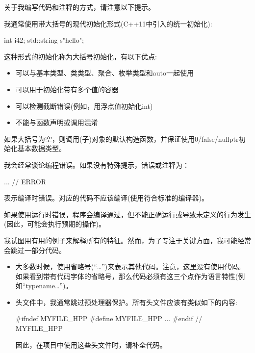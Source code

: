 
关于我编写代码和注释的方式，请注意以下提示。\par


我通常使用带大括号的现代初始化形式(C++11中引入的统一初始化):\par
\begin{codebox}[cpp]
int i{42};
std::string s{"hello"};
\end{codebox}

这种形式的初始化称为大括号初始化，有以下优点:\par
\begin{itemize}
  \item 可以与基本类型、类类型、聚合、枚举类型和auto一起使用
  \item 可以用于初始化带有多个值的容器
  \item 可以检测截断错误(例如，用浮点值初始化int)
  \item 不能与函数声明或调用混淆
\end{itemize}

如果大括号为空，则调用(子)对象的默认构造函数，并保证使用0/false/\allowbreak{}nullptr初始化基本数据类型。\par


我会经常谈论编程错误。如果没有特殊提示，错误或注释为：\par

\begin{codebox}[cpp]
... // ERROR
\end{codebox}

表示编译时错误。对应的代码不应该编译(使用符合标准的编译器)。\par

如果使用运行时错误，程序会编译通过，但不能正确运行或导致未定义的行为发生(因此，可能会执行预期的操作)。\par


我试图用有用的例子来解释所有的特征。然而，为了专注于关键方面，我可能经常会跳过一部分代码。\par

\begin{itemize}
  \item 大多数时候，使用省略号(“…”)来表示其他代码。注意，这里没有使用代码。如果看到带有代码字体的省略号，那么代码必须有这三个点作为语言特性(例如“typename…”)。
  \item 头文件中，我通常跳过预处理器保护。所有头文件应该有类似如下的内容:
\begin{codebox}[cpp]
  #ifndef MYFILE_HPP
  #define MYFILE_HPP
  ...
  #endif // MYFILE_HPP
\end{codebox}
  因此，在项目中使用这些头文件时，请补全代码。
\end{itemize}

